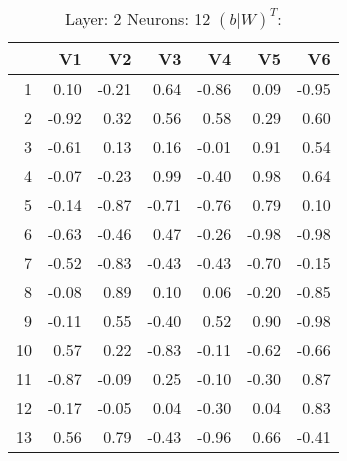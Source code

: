 \begin{table}[ht]
\centering
\begin{tabular}{rrrrrrr}
  \hline
 & V1 & V2 & V3 & V4 & V5 & V6 \\ 
  \hline
1 & 0.10 & -0.21 & 0.64 & -0.86 & 0.09 & -0.95 \\ 
  2 & -0.92 & 0.32 & 0.56 & 0.58 & 0.29 & 0.60 \\ 
  3 & -0.61 & 0.13 & 0.16 & -0.01 & 0.91 & 0.54 \\ 
  4 & -0.07 & -0.23 & 0.99 & -0.40 & 0.98 & 0.64 \\ 
  5 & -0.14 & -0.87 & -0.71 & -0.76 & 0.79 & 0.10 \\ 
  6 & -0.63 & -0.46 & 0.47 & -0.26 & -0.98 & -0.98 \\ 
  7 & -0.52 & -0.83 & -0.43 & -0.43 & -0.70 & -0.15 \\ 
  8 & -0.08 & 0.89 & 0.10 & 0.06 & -0.20 & -0.85 \\ 
  9 & -0.11 & 0.55 & -0.40 & 0.52 & 0.90 & -0.98 \\ 
  10 & 0.57 & 0.22 & -0.83 & -0.11 & -0.62 & -0.66 \\ 
  11 & -0.87 & -0.09 & 0.25 & -0.10 & -0.30 & 0.87 \\ 
  12 & -0.17 & -0.05 & 0.04 & -0.30 & 0.04 & 0.83 \\ 
  13 & 0.56 & 0.79 & -0.43 & -0.96 & 0.66 & -0.41 \\ 
   \hline
\end{tabular}
\caption{Layer: 2 Neurons: 12  $(b|W)^T$: 
} 
\end{table}
